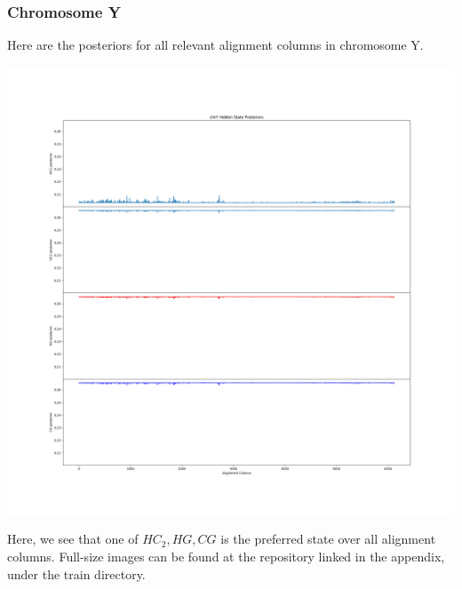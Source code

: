 \documentclass[12pt]{article}
\begin{document}
        \subsubsection{Chromosome Y}
        Here are the posteriors for all relevant alignment columns in chromosome Y.
        {\centering\includegraphics[width=1\textwidth]{train/chrY_posteriors}\par}
        Here, we see that one of $HC_2, HG, CG$ is the preferred state over all alignment columns. Full-size images can be found at the repository linked in the appendix, under the train directory.
\end{document}
